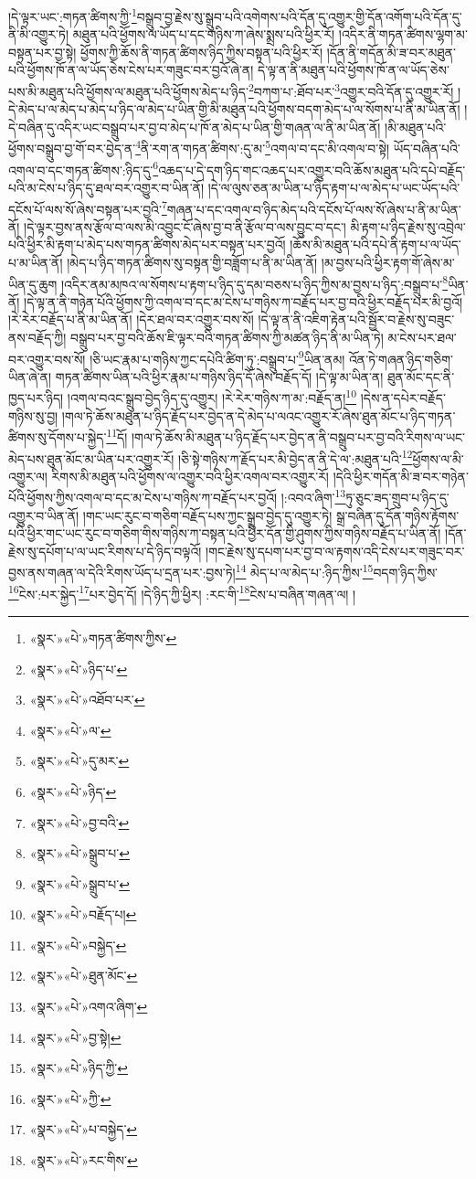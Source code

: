 །དེ་ལྟར་ཡང་:གཏན་ཚིགས་ཀྱི་\footnote{«སྣར་»«པེ་»གཏན་ཚིགས་ཀྱིས་}བསྒྲུབ་བྱ་རྗེས་སུ་སྒྲུབ་པའི་འགེགས་པའི་དོན་དུ་འགྱུར་གྱི་དོན་འགོག་པའི་དོན་དུ་ནི་མི་འགྱུར་ཏེ། མཐུན་པའི་ཕྱོགས་ལ་ཡོད་པ་དང་གཉིས་ཀ་ཞེས་སྨྲས་པའི་ཕྱིར་རོ། །འདིར་ནི་གཏན་ཚིགས་ལྷག་མ་བསྟན་པར་བྱ་སྟེ། ཕྱོགས་ཀྱི་ཆོས་ནི་གཏན་ཚིགས་ཉིད་ཀྱིས་བསྟན་པའི་ཕྱིར་རོ། །དོན་ནི་གདོན་མི་ཟ་བར་མཐུན་པའི་ཕྱོགས་ཁོ་ན་ལ་ཡོད་ཅེས་ངེས་པར་གཟུང་བར་བྱའོ་ཞེ་ན། དེ་ལྟ་ན་ནི་མཐུན་པའི་ཕྱོགས་ཁོ་ན་ལ་ཡོད་ཅེས་པས་མི་མཐུན་པའི་ཕྱོགས་ལ་མཐུན་པའི་ཕྱོགས་མེད་པ་ཉིད་\footnote{«སྣར་»«པེ་»ཉིད་པ་}བཀག་པ་:ཐོབ་པར་\footnote{«སྣར་»«པེ་»འཐོབ་པར་}འགྱུར་བའི་དོན་དུ་འགྱུར་རོ། །དེ་མེད་པ་ལ་མེད་པ་མེད་པ་ཉིད་ལ་མེད་པ་ཡིན་གྱི་མི་མཐུན་པའི་ཕྱོགས་བདག་མེད་པ་ལ་སོགས་པ་ནི་མ་ཡིན་ནོ། །དེ་བཞིན་དུ་འདིར་ཡང་བསྒྲུབ་པར་བྱ་བ་མེད་པ་ཁོ་ན་མེད་པ་ཡིན་གྱི་གཞན་ལ་ནི་མ་ཡིན་ནོ། །མི་མཐུན་པའི་ཕྱོགས་བསྒྲུབ་བྱ་གོ་བར་བྱེད་ན་\footnote{«སྣར་»«པེ་»ལ་}ནི་རག་ན་གཏན་ཚིགས་:དུ་མ་\footnote{«སྣར་»«པེ་»དུ་མར་}འགལ་བ་དང་མི་འགལ་བ་སྟེ། ཡོད་བཞིན་པའི་འགལ་བ་དང་གཏན་ཚིགས་:ཉིད་དུ་\footnote{«སྣར་»«པེ་»ཉིད་}འཆད་པ་དེ་དག་ཉིད་གང་འཆད་པར་འགྱུར་བའི་ཆོས་མཐུན་པའི་དཔེ་བརྗོད་པའི་མ་ངེས་པ་ཉིད་དུ་ཐལ་བར་འགྱུར་བ་ཡིན་ནོ། །དེ་ལ་ལུས་ཅན་མ་ཡིན་པ་ཉིད་རྟག་པ་ལ་མེད་པ་ཡང་ཡོད་པའི་དངོས་པོ་ལས་སོ་ཞེས་བསྟན་པར་བྱའི་\footnote{«སྣར་»«པེ་»བྱ་བའི་}གཞན་པ་དང་འགལ་བ་ཉིད་མེད་པའི་དངོས་པོ་ལས་སོ་ཞེས་པ་ནི་མ་ཡིན་ནོ། །དེ་ལྟར་བྱས་ནས་རྩོལ་བ་ལས་མི་འབྱུང་ངོ་ཞེས་བྱ་བ་ནི་རྩོལ་བ་ལས་བྱུང་བ་དང་། མི་རྟག་པ་ཉིད་རྗེས་སུ་འབྲེལ་པའི་ཕྱིར་མི་རྟག་པ་མེད་པས་གཏན་ཚིགས་མེད་པར་བསྟན་པར་བྱའོ། །ཆོས་མི་མཐུན་པའི་དཔེ་ནི་རྟག་པ་ལ་ཡོད་པ་མ་ཡིན་ནོ། །མེད་པ་ཉིད་གཏན་ཚིགས་སུ་བསྟན་གྱི་བཟློག་པ་ནི་མ་ཡིན་ནོ། །མ་བྱས་པའི་ཕྱིར་རྟག་གོ་ཞེས་མ་ཡིན་དུ་ཆུག །འདིར་ནམ་མཁའ་ལ་སོགས་པ་རྟག་པ་ཉིད་དུ་དམ་བཅས་པ་ཉིད་ཀྱིས་མ་བྱས་པ་ཉིད་:བསྒྲུབ་པ་\footnote{«སྣར་»«པེ་»སྒྲུབ་པ་}ཡིན་ནོ། །དེ་ལྟ་ན་ནི་གཉེན་པོའི་ཕྱོགས་ཀྱི་འགལ་བ་དང་མ་ངེས་པ་གཉིས་ཀ་བརྗོད་པར་བྱ་བའི་ཕྱིར་བརྗོད་པར་མི་བྱའོ། །རེ་རེར་བརྗོད་པ་ནི་མ་ཡིན་ནོ། །དེར་ཐལ་བར་འགྱུར་བས་སོ། །དེ་ལྟ་ན་ནི་འཇིག་རྟེན་པའི་སྦྱོར་བ་རྗེས་སུ་བཟུང་ནས་བརྗོད་ཀྱི། བསྒྲུབ་པར་བྱ་བའི་ཆོས་ཇི་ལྟར་བའི་གཏན་ཚིགས་ཀྱི་མཚན་ཉིད་ནི་མ་ཡིན་ཏེ། མ་ངེས་པར་ཐལ་བར་འགྱུར་བས་སོ། །ཅི་ཡང་རྣམ་པ་གཉིས་ཀྱང་དཔེའི་ཚིག་ཏུ་:བསྒྲུབ་པ་\footnote{«སྣར་»«པེ་»སྒྲུབ་པ་}ཡིན་ནམ། འོན་ཏེ་གཞན་ཉིད་གཅིག་ཡིན་ཞེ་ན། གཏན་ཚིགས་ཡིན་པའི་ཕྱིར་རྣམ་པ་གཉིས་ཉིད་དོ་ཞེས་བརྗོད་དོ། །དེ་ལྟ་མ་ཡིན་ན། ཐུན་མོང་དང་ནི་ཁྱད་པར་ཉིད། །འགལ་བའང་སྒྲུབ་བྱེད་ཉིད་དུ་འགྱུར། །རེ་རེར་གཉིས་ཀ་མ་:བརྗོད་ན།\footnote{«སྣར་»«པེ་»བརྗོད་པ།} །དེས་ན་དཔེར་བརྗོད་གཉིས་སུ་བྱ། །གལ་ཏེ་ཆོས་མཐུན་པ་ཉིད་རྗོད་པར་བྱེད་ན་དེ་མེད་པ་ལའང་འགྱུར་རོ་ཞེས་ཐུན་མོང་པ་ཉིད་གཏན་ཚིགས་སུ་དོགས་པ་སྐྱེད་\footnote{«སྣར་»«པེ་»བསྐྱེད་}དོ། །གལ་ཏེ་ཆོས་མི་མཐུན་པ་ཉིད་རྗོད་པར་བྱེད་ན་ནི་བསྒྲུབ་པར་བྱ་བའི་རིགས་ལ་ཡང་མེད་པས་ཐུན་མོང་མ་ཡིན་པར་འགྱུར་རོ། །ཅི་སྟེ་གཉིས་ཀ་རྗོད་པར་མི་བྱེད་ན་ནི་དེ་ལ་:མཐུན་པའི་\footnote{«སྣར་»«པེ་»ཐུན་མོང་}ཕྱོགས་ལ་མི་འགྱུར་ལ། རིགས་མི་མཐུན་པའི་ཕྱོགས་ལ་འགྱུར་བའི་ཕྱིར་འགལ་བར་འགྱུར་རོ། །དེའི་ཕྱིར་གདོན་མི་ཟ་བར་གཉེན་པོའི་ཕྱོགས་ཀྱིས་འགལ་བ་དང་མ་ངེས་པ་གཉིས་ཀ་བརྗོད་པར་བྱའོ། །:འབའ་ཞིག་\footnote{«སྣར་»«པེ་»འགའ་ཞིག་}ཏུ་ཅུང་ཟད་གྲུབ་པ་ཉིད་དུ་འགྱུར་བ་ཡིན་ནོ། །གང་ཡང་རུང་བ་གཅིག་བརྗོད་པས་ཀྱང་སྒྲུབ་བྱེད་དུ་འགྱུར་ཏེ། སྒྲ་བཞིན་དུ་དོན་གཉིས་རྟོགས་པའི་ཕྱིར་གང་ཡང་རུང་བ་གཅིག་གིས་གཉིས་ཀ་བསྟན་པའི་ཕྱིར་དོན་གྱི་ཤུགས་ཀྱིས་གཉིས་བརྗོད་པ་ཡིན་ནོ། །དོན་རྗེས་སུ་དཔོག་པ་ལ་ཡང་རིགས་པ་དེ་ཉིད་བལྟའོ། །གང་རྗེས་སུ་དཔག་པར་བྱ་བ་ལ་རྟགས་འདི་ངེས་པར་གཟུང་བར་བྱས་ནས་གཞན་ལ་དེའི་རིགས་ཡོད་པ་དྲན་པར་:བྱས་ཏེ།\footnote{«སྣར་»«པེ་»བྱ་སྟེ།} མེད་པ་ལ་མེད་པ་:ཉིད་ཀྱིས་\footnote{«སྣར་»«པེ་»ཉིད་ཀྱི་}བདག་ཉིད་ཀྱིས་\footnote{«སྣར་»«པེ་»ཀྱི་}ངེས་:པར་སྐྱེད་\footnote{«སྣར་»«པེ་»པ་བསྐྱེད་}པར་བྱེད་དོ། །དེ་ཉིད་ཀྱི་ཕྱིར། :རང་གི་\footnote{«སྣར་»«པེ་»རང་གིས་}ངེས་པ་བཞིན་གཞན་ལ། །
